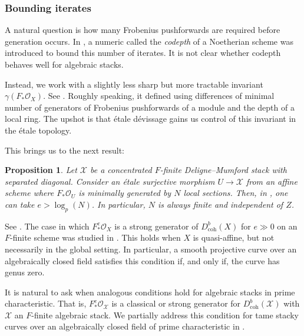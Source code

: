 \documentclass[11pt]{amsart}
\theoremstyle{plain}
\newtheorem{proposition}[theorem]{Proposition}
\theoremstyle{definition}
\numberwithin{equation}{section}
\numberwithin{theorem}{section}
\begin{document}
\subsubsection{Bounding iterates}
\label{sec:intro_what_we_do_iterate}

A natural question is how many Frobenius pushforwards are required before generation occurs. 
In \cite{Ballard/Iyengar/Lank/Mukhopadhyay/Pollitz:2023}, a numeric called the \textit{codepth} of a Noetherian scheme was introduced to bound this number of iterates. 
It is not clear whether codepth behaves well for algebraic stacks.

Instead, we work with a slightly less sharp but more tractable invariant $\gamma(F_\ast \mathcal{O}_X)$.
See . 
Roughly speaking, it defined using differences of minimal number of generators of Frobenius pushforwards of a module and the depth of a local ring. 
The upshot is that \'{e}tale d\'{e}vissage gains us control of this invariant in the \'{e}tale topology. 

This brings us to the next result:

\begin{proposition}
    \label{introprop:Frobenius_generation_bound}
    Let $\mathcal{X}$ be a concentrated $F$-finite Deligne--Mumford stack with separated diagonal. 
    Consider an \'{e}tale surjective morphism $U\to \mathcal{X}$ from an affine scheme where $F_\ast \mathcal{O}_U$ is minimally generated by $N$ local sections. 
    Then, in , one can take $e> \log_p (N) $. 
    In particular, $N$ is always finite and independent of $Z$.
\end{proposition}

See . 
The case in which $F_\ast^e \mathcal{O}_X$ is a strong generator of $D^b_{\operatorname{coh}}(X)$ for $e\gg 0$ on an $F$-finite scheme was studied in \cite{Ballard/Iyengar/Lank/Mukhopadhyay/Pollitz:2023}. 
This holds when $X$ is quasi-affine, but not necessarily in the global setting. In particular, a smooth projective curve over an algebraically closed field satisfies this condition if, and only if, the curve has genus zero. 

It is natural to ask when analogous conditions hold for algebraic stacks in prime characteristic. 
That is, $F_\ast^e \mathcal{O}_{\mathcal{X}}$ is a classical or strong generator for $D^b_{\operatorname{coh}}(\mathcal{X})$ with $\mathcal{X}$ an $F$-finite algebraic stack. 
We partially address this condition for tame stacky curves over an algebraically closed field of prime characteristic in . 
\end{document}

